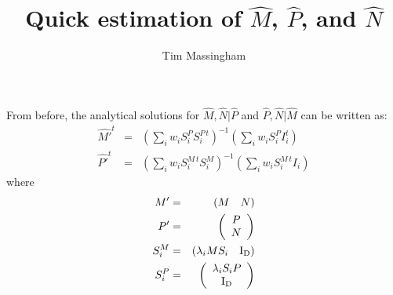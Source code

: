 \documentclass[12pt]{amsart}
\title{Quick estimation of $\hat{M}$, $\hat{P}$, and $\hat{N}$}
\author{Tim Massingham}
\newcommand{\Id}{ {\rm I_D} }
\begin{document}
\maketitle

From before, the analytical solutions for $\hat{M},\hat{N}|\hat{P}$ and  $\hat{P},\hat{N}|\hat{M}$ can be written as:
\begin{eqnarray}
\label{Mhat}
\hat{M'}^t & = & \left( \sum_i w_i S_i^P S_i^{P\,t} \right)^{-1} \left( \sum_i w_i S_i^P I_i^t \right) \\
\label{Phat}
\hat{P'}^t & = & \left( \sum_i w_i S_i^{M\,t} S_i^{M} \right)^{-1} \left( \sum_i w_i S_i^{M\,t} I_i \right)
\end{eqnarray}
where
\begin{eqnarray*}
M' 		& = & \left( M \quad N \right) \\
P' 		& = & \left( \begin{array}{c} P \\ N \end{array} \right) \\
S_i^M	& = & \left( \lambda_i M S_i \quad  \Id \right) \\
S_i^P	& = & \left( \begin{array}{c}  \lambda_i S_i P \\  \Id \end{array} \right)
\end{eqnarray*} 
\end{document}
